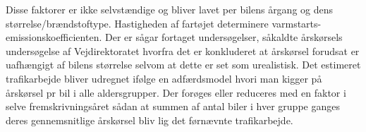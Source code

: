 \vspace{5mm}

Disse faktorer er ikke selvstændige og bliver lavet per bilens årgang og dens størrelse/brændstoftype. Hastigheden af fartøjet determinere varmstarts-emissionskoefficienten. Der er sågar fortaget undersøgelser, såkaldte årskørsels undersøgelse af Vejdirektoratet hvorfra det er konkluderet at årskørsel forudsat er uafhængigt af bilens størrelse selvom at dette er set som urealistisk. Det estimeret trafikarbejde bliver udregnet ifølge en adfærdsmodel hvori man kigger på årskørsel pr bil i alle aldersgrupper. Der forøges eller reduceres med en faktor i selve fremskrivningsåret sådan at summen af antal biler i hver gruppe ganges deres gennemsnitlige årskørsel bliv lig det førnævnte trafikarbejde.




